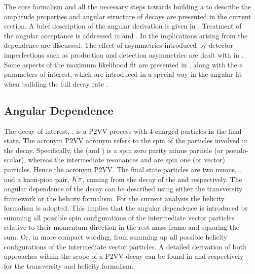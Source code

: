 
The core formalism and all the necessary steps towards building a \pdf to describe the amplitude properties and angular structure of \BJpsiKst decays are presented in
the current section. A brief description of the angular \pdf derivation is given in .
Treatment of the angular acceptance is addressed in  and .
In  the implications arising from the \mkpi dependence are discussed.
The effect of asymmetries introduced by detector imperfections such as production and detection asymmetries are dealt with
in . Some aspects of the maximum likelihood fit are presented in ,
along with the \Acp{} parameters of interest, which are introduced in a special way in the angular fit when building the full decay rate \pdf.


\subsection{Angular Dependence}
\label{Diferential_Decay_Rate}

The decay of interest, \BsJpsiKst, is a P2VV process with 4 charged particles in the final state.
The acronym P2VV acronym refers to the spin of the particles involved in the decay.
Specifically, the \Bs (and \Bd) is a spin zero parity minus particle (or pseudo-scalar), whereas the intermediate resonances
\jpsi and \Kstarzb are spin one (or vector) particles. Hence the acronym P2VV. The final state particles are
two muons, \mmu, and a kaon-pion pair, $K\pi$, coming from the decay of the \jpsi and \Kstarzb respectively.
The angular dependence of the \BsJpsiKst decay can be described using either the transversity framework\cite{transvFrameworkI,transvFrameworkII}
or the helicity formalism\cite{helicityFormI,helicityFormII}. For the current analysis the helicity
formalism is adopted. This implies that the angular dependence is introduced by summing all possible
spin configurations of the intermediate vector particles relative to their momentum direction in the
\Bs rest mass frame and squaring the sum. Or, in more compact wording, from summing up all possible
helicity configurations of the intermediate vector particles. A detailed derivation of both approaches
within the scope of a P2VV decay can be found in \cite{daanThesis} and \cite{jeroenThesis} respectively
for the transversity and helicity formalism.

